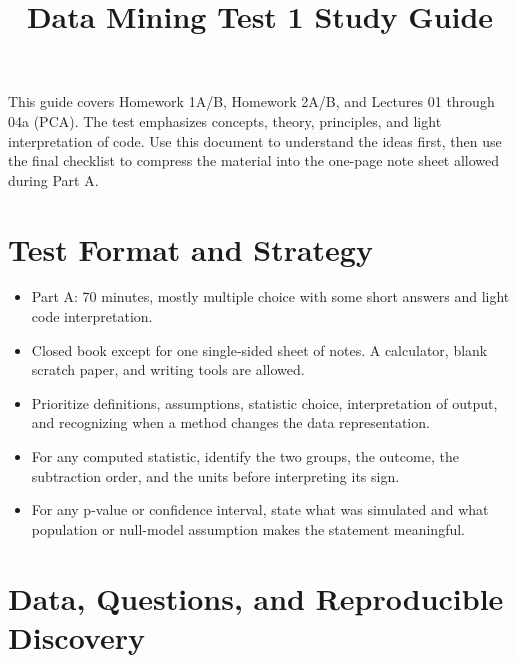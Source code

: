 \documentclass[11pt]{article}
\title{\textcolor{ink}{Data Mining Test 1 Study Guide}}
\author{}
\date{}
\begin{document}
\maketitle
\thispagestyle{fancy}

This guide covers Homework 1A/B, Homework 2A/B, and Lectures 01 through 04a (PCA). The test emphasizes concepts, theory, principles, and light interpretation of code. Use this document to understand the ideas first, then use the final checklist to compress the material into the one-page note sheet allowed during Part A.

\section*{Test Format and Strategy}
\begin{itemize}
	\item Part A: 70 minutes, mostly multiple choice with some short answers and light code interpretation.
	\item Closed book except for one single-sided sheet of notes. A calculator, blank scratch paper, and writing tools are allowed.
	\item Prioritize definitions, assumptions, statistic choice, interpretation of output, and recognizing when a method changes the data representation.
	\item For any computed statistic, identify the two groups, the outcome, the subtraction order, and the units before interpreting its sign.
	\item For any p-value or confidence interval, state what was simulated and what population or null-model assumption makes the statement meaningful.
\end{itemize}

\section{Data, Questions, and Reproducible Discovery}
\end{document}
